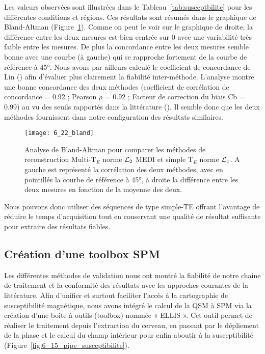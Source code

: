 {\begin {table}
\end{table}
Les valeurs observées sont illustrées dans le Tableau~\ref{tab:susceptbilite} pour les différentes conditions et
régions. Ces résultats sont résumés dans le graphique de Bland-Altman (Figure~\ref{fig:6_22_bland}). Comme on peut le
voir sur le graphique de droite, la différence entre les deux mesures est bien centrée sur 0 avec une
variabilité très faible entre les mesures. De plus la concordance entre les deux mesures semble bonne
avec une courbe (à gauche) qui se rapproche fortement de la courbe de référence à 45°. Nous avons
par ailleurs calculé le coefficient de concordance de Lin (\cite{Lin1989}) afin d’évaluer plus clairement la fiabilité
inter-méthode. L’analyse montre une bonne concordance des deux méthodes (coefficient de
corrélation de concordance = 0.92 ; Pearson $\rho$ = 0.92 ; Facteur de correction du biais Cb = 0.99) au vu
des seuils rapportés dans la littérature (\cite{Mcbride2005}). Il semble donc que les deux méthodes fournissent dans
notre configuration des résultats similaires.

\begin{figure}[!t]
\centering
\texttt{[image: 6\_22\_bland]}
\caption{Analyse de Bland-Altman pour comparer les méthodes de reconstruction Multi-T$_E$ norme ${\cal L}_2$ MEDI et simple T$_E$
norme ${\cal L}_1$. A gauche est représenté la corrélation des deux méthodes, avec en pointillés la courbe de référence à 45°, à droite
la différence entre les deux mesures en fonction de la moyenne des deux.}
\label{fig:6_22_bland}	
\end{figure}
Nous pouvons donc utiliser des séquences de type simple-TE offrant l’avantage de réduire le
temps d’acquisition tout en conservant une qualité de résultat suffisante pour extraire des résultats
fiables.
\subsection{Création d’une toolbox SPM}
Les différentes méthodes de validation nous ont montré la fiabilité de notre chaine de
traitement et la conformité des résultats avec les approches courantes de la littérature. Afin d’unifier
et surtout faciliter l’accès à la cartographie de susceptibilité magnétique, nous avons intégré le calcul
de la QSM à SPM via la création d’une boite à outils (toolbox) nommée « ELLIS ». Cet outil permet de
réaliser le traitement depuis l’extraction du cerveau, en passant par le dépliement de la phase et le
calcul du champ intérieur pour enfin aboutir à la susceptibilité (Figure~\ref{fig:6_15_pipe_susceptibilite}).

}
